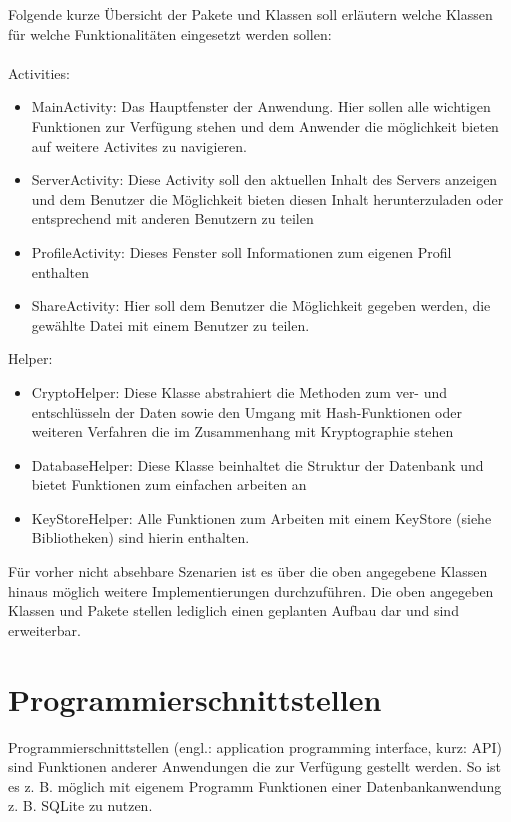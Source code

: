 \documentclass[10pt, a4paper]{scrreprt}
\begin{document}
Folgende kurze Übersicht der Pakete und Klassen soll erläutern welche Klassen für welche Funktionalitäten eingesetzt werden sollen:\\ \\
Activities:
\begin{itemize}
\item MainActivity: Das Hauptfenster der Anwendung. Hier sollen alle wichtigen Funktionen zur Verfügung stehen und dem Anwender die möglichkeit bieten auf weitere Activites zu navigieren.
\item ServerActivity: Diese Activity soll den aktuellen Inhalt des Servers anzeigen und dem Benutzer die Möglichkeit bieten diesen Inhalt herunterzuladen oder entsprechend mit anderen Benutzern zu teilen
\item ProfileActivity: Dieses Fenster soll Informationen zum eigenen Profil enthalten
\item ShareActivity: Hier soll dem Benutzer die Möglichkeit gegeben werden, die gewählte Datei mit einem Benutzer zu teilen.
\end{itemize}
Helper:
\begin{itemize}
\item CryptoHelper: Diese Klasse abstrahiert die Methoden zum ver- und entschlüsseln der Daten sowie den Umgang mit Hash-Funktionen oder weiteren Verfahren die im Zusammenhang mit Kryptographie stehen
\item DatabaseHelper: Diese Klasse beinhaltet die Struktur der Datenbank und bietet Funktionen zum einfachen arbeiten an
\item KeyStoreHelper: Alle Funktionen zum Arbeiten mit einem KeyStore (siehe Bibliotheken) sind hierin enthalten.
\end{itemize}
Für vorher nicht absehbare Szenarien ist es über die oben angegebene Klassen hinaus möglich weitere Implementierungen durchzuführen. Die oben angegeben Klassen und Pakete stellen lediglich einen geplanten Aufbau dar und sind erweiterbar.


\section{Programmierschnittstellen}
Programmierschnittstellen (engl.: application programming interface, kurz: API) sind Funktionen anderer Anwendungen die zur Verfügung gestellt werden. So ist es z. B. möglich mit eigenem Programm Funktionen einer Datenbankanwendung z. B. SQLite zu nutzen.
\end{document}
